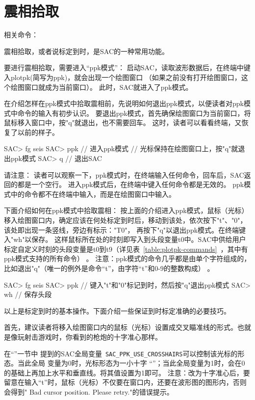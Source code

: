 \section{震相拾取}
\label{sec:phase-picking}
相关命令：

震相拾取，或者说标定到时，是SAC的一种常用功能。

要进行震相拾取，需要进入“ppk模式”：
启动SAC，读取波形数据后，在终端中键入plotpk(简写为ppk)，就会出现一个绘图窗口
（如果之前没有打开绘图窗口，这个绘图窗口就成为当前窗口）。
此时，SAC就进入了ppk模式。

在介绍怎样在ppk模式中拾取震相前，先说明如何退出ppk模式，以便读者对ppk模式中命令的输入有初步认识。
要退出ppk模式，首先确保绘图窗口为当前窗口，将鼠标移入窗口中，按"q"就退出，也不需要回车。
这时，读者可以看看终端，又恢复了以前的样子。

\begin{SACCode}
SAC> fg seis
SAC> ppk        // 进入ppk模式
// 光标保持在绘图窗口上，按"q"就退出ppk模式
SAC> q          // 退出SAC
\end{SACCode}

请注意：
读者可以观察一下，ppk模式时，在终端输入任何命令，回车后，SAC返回的都是一个空行。
进入ppk模式后，在终端中键入任何命令都是无效的。
ppk模式中的命令都不在终端中输入，而是在绘图窗口中输入。

下面介绍如何在ppk模式中拾取震相：
按上面的介绍进入ppk模式，鼠标（光标）移入绘图窗口内，确定应该在何处标定到时后，移动到该处，依次按下"t"、"0"，该处即出现一条竖线，旁边有标示："T0"，
再按下"q"以退出ppk模式。在终端键入"wh"以保存。
这样鼠标所在处的时刻即写入到头段变量t0中。SAC中供给用户标定自定义时刻的头段变量是t0到t9（详见表~\ref{table:plotpk-commands}~，其中有ppk模式支持的所有命令） 。
注意：ppk模式的命令几乎都是由单个字符组成的，比如退出"q"（唯一的例外是命令``t''，由字符``t''和0-9的整数构成） 。


\begin{SACCode}
SAC> fg seis
SAC> ppk
// 键入"t"和"0"标记到时，然后按"q"退出ppk模式
SAC> wh         // 保存头段
\end{SACCode}
以上是标定到时的基本操作。下面介绍一些保证到时标定准确的必要技巧。


首先，建议读者将移入绘图窗口内的鼠标（光标）设置成交叉瞄准线的形式。也就是像玩射击游戏时，你看到的枪炮的十字准心那样。

在``''一节中
提到的SAC全局变量~\verb+SAC_PPK_USE_CROSSHAIRS+可以控制该光标的形态。当此全局
变量为0时，光标形态为一小十字
``''；当此全局变量为1时，会在0的基础上再加上水平和垂直线。将其值设置为1即可。
注意：改为十字准心后，要留意在输入“t”时，鼠标（光标）不仅要在窗口内，还要在波形图的图形内，否则会得到" Bad cursor position. Please retry."的错误提示。

